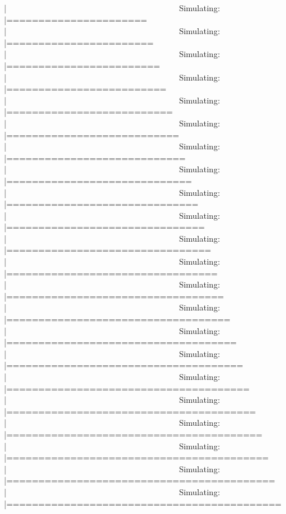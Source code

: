 \documentclass[]{article}
\newenvironment{Shaded}{\begin{snugshade}}{\end{snugshade}}
\theoremstyle{definition}
\theoremstyle{definition}
\theoremstyle{definition}
\theoremstyle{remark}
\begin{document}
\begin{Shaded}
\begin{Highlighting}[]
|Simulating: |======================                                       |Simulating: |=======================                                      |Simulating: |========================                                     |Simulating: |=========================                                    |Simulating: |==========================                                   |Simulating: |===========================                                  |Simulating: |============================                                 |Simulating: |=============================                                |Simulating: |==============================                               |Simulating: |===============================                              |Simulating: |================================                             |Simulating: |=================================                            |Simulating: |==================================                           |Simulating: |===================================                          |Simulating: |====================================                         |Simulating: |=====================================                        |Simulating: |======================================                       |Simulating: |=======================================                      |Simulating: |========================================                     |Simulating: |=========================================                    |Simulating: |==========================================                   |Simulating: |===========================================                
\end{Highlighting}
\end{Shaded}
\end{document}
